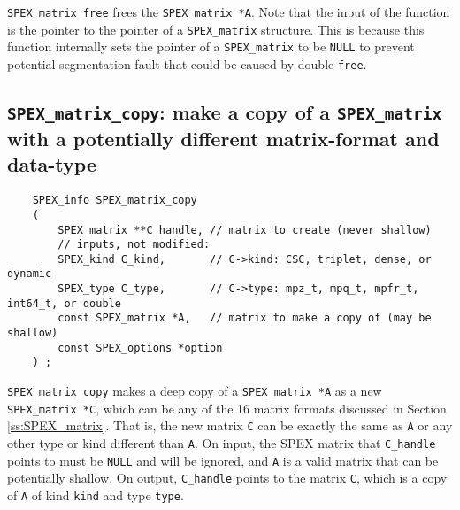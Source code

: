 \documentclass[12pt,oneside]{book}
\theoremstyle{definition}
\begin{document}
\verb|SPEX_matrix_free| frees the \verb|SPEX_matrix *A|.  Note that the input
of the function is the pointer to the pointer of a \verb|SPEX_matrix|
structure. This is because this function internally sets the pointer of a
\verb|SPEX_matrix| to be \verb|NULL| to prevent potential segmentation fault
that could be caused by double \verb|free|.


\subsection{\texttt{SPEX\_matrix\_copy}: make a copy of a \texttt{SPEX\_matrix} with a potentially different matrix-format and data-type} \label{s:user:matrix_copy}
\begin{mdframed}[userdefinedwidth=\textwidth]
{\footnotesize
\begin{verbatim}
    SPEX_info SPEX_matrix_copy
    (
        SPEX_matrix **C_handle, // matrix to create (never shallow)
        // inputs, not modified:
        SPEX_kind C_kind,       // C->kind: CSC, triplet, dense, or dynamic
        SPEX_type C_type,       // C->type: mpz_t, mpq_t, mpfr_t, int64_t, or double
        const SPEX_matrix *A,   // matrix to make a copy of (may be shallow)
        const SPEX_options *option
    ) ;
\end{verbatim}
} \end{mdframed}

\verb|SPEX_matrix_copy| makes a deep copy of a \verb|SPEX_matrix *A| as a new \verb|SPEX_matrix *C|, which can be any of the 16 matrix formats discussed in Section \ref{ss:SPEX_matrix}. That is, the new matrix \verb|C| can be exactly the same as \verb|A| or any other type or kind
different than \verb|A|.  On input, the SPEX matrix that \verb|C_handle| points to must be \verb|NULL| and will be ignored, and \verb|A| is a valid matrix that can be potentially shallow. On output, \verb|C_handle| points to the matrix
\verb|C|, which is a copy of \verb|A| of kind \verb|kind| and type \verb|type|. 
\end{document}
